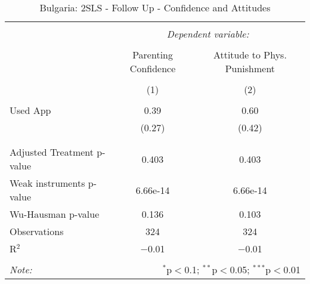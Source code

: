 
\begin{table}[!htbp] \centering 
  \caption{Bulgaria: 2SLS - Follow Up - Confidence and Attitudes} 
  \label{tbl:Bulgaria: 2SLS - Follow Up - Confidence and Attitudes} 
\begin{tabular}{@{\extracolsep{5pt}}lcc} 
\\[-1.8ex]\hline 
\hline \\[-1.8ex] 
 & \multicolumn{2}{c}{\textit{Dependent variable:}} \\ 
\cline{2-3} 
\\[-1.8ex] & Parenting Confidence & Attitude to Phys. Punishment \\ 
\\[-1.8ex] & (1) & (2)\\ 
\hline \\[-1.8ex] 
 Used App & 0.39 & 0.60 \\ 
  & (0.27) & (0.42) \\ 
  & & \\ 
\hline \\[-1.8ex] 
Adjusted Treatment p-value & 0.403 & 0.403 \\ 
Weak instruments p-value & 6.66e-14 & 6.66e-14 \\ 
Wu-Hausman p-value & 0.136 & 0.103 \\ 
Observations & 324 & 324 \\ 
R$^{2}$ & $-$0.01 & $-$0.01 \\ 
\hline 
\hline \\[-1.8ex] 
\textit{Note:}  & \multicolumn{2}{r}{$^{*}$p$<$0.1; $^{**}$p$<$0.05; $^{***}$p$<$0.01} \\ 
\end{tabular} 
\end{table} 
